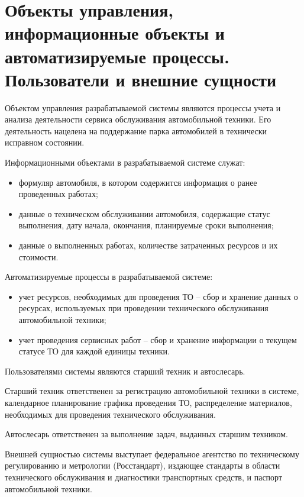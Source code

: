 \section{Объекты управления, информационные объекты и автоматизируемые процессы.
  Пользователи и внешние сущности}
Объектом управления разрабатываемой системы являются процессы учета и анализа
деятельности сервиса обслуживания автомобильной техники.
Его деятельность нацелена на поддержание парка автомобилей в технически
исправном состоянии.

Информационными объектами в разрабатываемой системе служат:
\begin{itemize}
	\item формуляр автомобиля, в котором содержится информация о ранее
        проведенных работах;
	\item данные о техническом обслуживании автомобиля, содержащие статус
        выполнения, дату начала, окончания, планируемые сроки выполнения;
	\item данные о выполненных работах, количестве затраченных ресурсов и
        их стоимости.
\end{itemize}

Автоматизируемые процессы в разрабатываемой системе:
\begin{itemize}

	\item учет ресурсов, необходимых для проведения ТО -- сбор и хранение данных
		о ресурсах, используемых при проведении технического обслуживания
        автомобильной техники;

    \item учет проведения сервисных работ -- сбор и хранение информации о
        текущем статусе ТО для каждой единицы техники.

\end{itemize}

Пользователями системы являются старший техник и автослесарь.

Старший техник ответственен за регистрацию автомобильной техники в системе,
календарное планирование графика проведения ТО, распределение материалов,
необходимых для проведения технического обслуживания.

Автослесарь ответственен за выполнение задач, выданных старшим техником.

Внешней сущностью системы выступает федеральное агентство по техническому
регулированию и метрологии (Росстандарт), издающее стандарты в области
технического обслуживания и диагностики транспортных средств, и паспорт
автомобильной техники.
